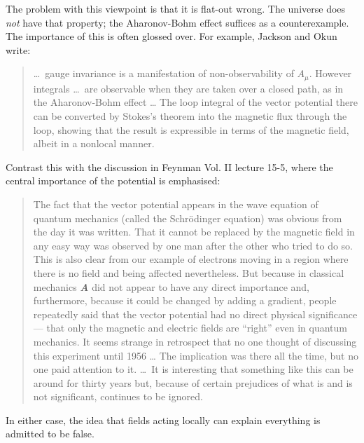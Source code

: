 The problem with this viewpoint is that it is flat-out wrong.
The universe does \textit{not} have that property;
the Aharonov-Bohm effect \cite{Ehrenberg1949,Aharonov1959} suffices as a counterexample.
The importance of this is often glossed over.
For example, Jackson and Okun \cite[p.24]{Jackson2001} write:
\begin{quote}
\ldots\ gauge invariance is a manifestation of non-observability of $A_\mu$.
However integrals \ldots\ are observable when they are taken over a closed path, as in the Aharonov-Bohm effect \ldots\@
The loop integral of the vector potential there can be converted by Stokes's theorem into the magnetic flux through the loop,
showing that the result is expressible in terms of the magnetic field, albeit in a nonlocal manner.
\end{quote}
Contrast this with the discussion in Feynman Vol. II \cite{FeynmanII} lecture 15-5,
where the central importance of the potential is
emphasised: %
\begin{quote}
The fact that the vector potential appears in the wave equation of quantum mechanics
(called the Schr\"{o}dinger equation)
was obvious from the day it was written.
That it cannot be replaced by the magnetic field in any easy way
was observed by one man after the other who tried to do so.
This is also clear from our example
of electrons moving in a region where there is no field and being affected nevertheless.
But because in classical mechanics \textit{\textbf{A}} did not appear to have any direct importance and,
furthermore, because it could be changed by adding a gradient,
people repeatedly said that the vector potential had no direct physical significance ---
that only the magnetic and electric fields are ``right'' even in quantum mechanics.
It seems strange in retrospect that no one thought of discussing this experiment until 1956 \ldots
The implication was there all the time, but no one paid attention to it. \ldots\ 
It is interesting that something like this can be around for thirty years but,
because of certain prejudices of what is and is not significant,
continues to be ignored.
\end{quote}
In either case, the idea that fields acting locally can explain everything is admitted to be false.

